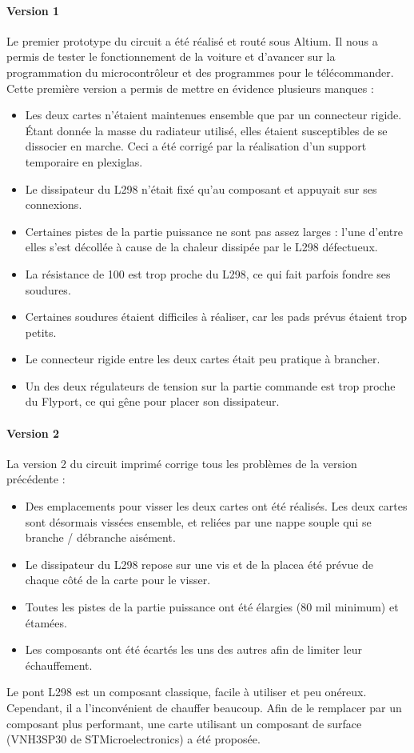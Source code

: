 \documentclass[a4paper,12pt]{report}
\begin{document}
				\paragraph{Version 1}
				Le premier prototype du circuit a été réalisé et routé sous Altium. Il nous a permis de tester le fonctionnement de la voiture et d’avancer sur la programmation du microcontrôleur et des programmes pour le télécommander.
Cette première version a permis de mettre en évidence plusieurs manques :
\begin{itemize}
\item Les deux cartes n’étaient maintenues ensemble que par un connecteur rigide. Étant donnée la masse du radiateur utilisé, elles étaient susceptibles de se dissocier en marche. Ceci a été corrigé par la réalisation d’un support temporaire en plexiglas.
\item Le dissipateur du L298 n’était fixé qu’au composant et appuyait sur ses connexions.
\item Certaines pistes de la partie puissance ne sont pas assez larges : l’une d’entre elles s’est décollée à cause de la chaleur dissipée par le L298 défectueux.
\item La résistance de \unit{100}{\milli \ohm} est trop proche du L298, ce qui fait parfois fondre ses soudures.
\item Certaines soudures étaient difficiles à réaliser, car les pads prévus étaient trop petits.
\item Le connecteur rigide entre les deux cartes était peu pratique à brancher.
\item Un des deux régulateurs de tension sur la partie commande est trop proche du Flyport, ce qui gêne pour placer son dissipateur.
\end{itemize}


				\paragraph{Version 2}
				La version 2 du circuit imprimé corrige tous les problèmes de la version précédente :
\begin{itemize}
\item Des emplacements pour visser les deux cartes ont été réalisés. Les deux cartes sont désormais vissées ensemble, et reliées par une nappe souple qui se branche / débranche aisément.
\item Le dissipateur du L298 repose sur une vis et de la placea été prévue de chaque côté de la carte pour le visser.
\item Toutes les pistes de la partie puissance ont été élargies (80 mil minimum) et étamées.
\item Les composants ont été écartés les uns des autres afin de limiter leur échauffement.
\end{itemize}
Le pont L298 est un composant classique, facile à utiliser et peu onéreux. Cependant, il a l’inconvénient de chauffer beaucoup. Afin de le remplacer par un composant plus performant, une carte utilisant un composant de surface (VNH3SP30 de STMicroelectronics) a été proposée.
\end{document}
